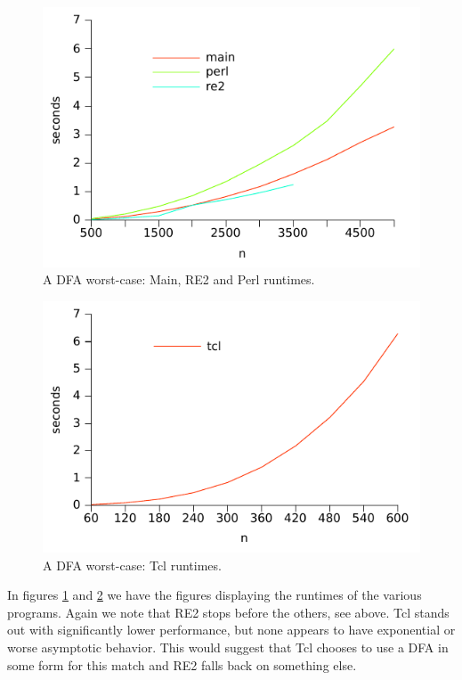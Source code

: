 \begin{figure}
\centering
\includegraphics{benchmarks/dfaworstcase_mainre2perl_normal.pdf}
\caption{A DFA worst-case: Main, RE2 and Perl runtimes.}
\label{fig:dfaworstcase_mainre2perl_normal}
\end{figure}

\begin{figure}
\centering
\includegraphics{benchmarks/dfaworstcase_tcl_normal.pdf}
\caption{A DFA worst-case: Tcl runtimes.}
\label{fig:dfaworstcase_tcl_normal}
\end{figure}

In figures \ref{fig:dfaworstcase_mainre2perl_normal} and
\ref{fig:dfaworstcase_tcl_normal} we have the figures displaying the
runtimes of the various programs. Again we note that RE2 stops before
the others, see above. Tcl stands out with significantly lower
performance, but none appears to have exponential or worse asymptotic
behavior. This would suggest that Tcl chooses to use a DFA in some
form for this match and RE2 falls back on something else.


